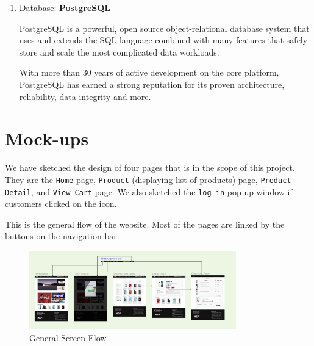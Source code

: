 \documentclass[a4paper]{article}
\numberwithin{equation}{section}
\begin{document}
\begin{enumerate}[label=\alph*.]
  \item Database: \textbf{PostgreSQL}

        PostgreSQL is a powerful, open source object-relational database system that uses and extends the SQL language combined with many features that safely store and scale the most complicated data workloads.

        With more than 30 years of active development on the core platform, PostgreSQL has earned a strong reputation for its proven architecture, reliability, data integrity and more.
\end{enumerate}

\newpage

\section{Mock-ups}

We have sketched the design of four pages that is in the scope of this project.
They are the \texttt{Home} page, \texttt{Product} (displaying list of products) page, \texttt{Product Detail}, and \texttt{View Cart} page.
We also sketched the \texttt{log in} pop-up window if customers clicked on the icon.

This is the general flow of the website.
Most of the pages are linked by the buttons on the navigation bar.

\begin{figure}[H]
  \centering
  \includegraphics[width=0.8\textwidth]{assets/p2/screenflow.png}
  \caption{General Screen Flow}
\end{figure}
\end{document}
